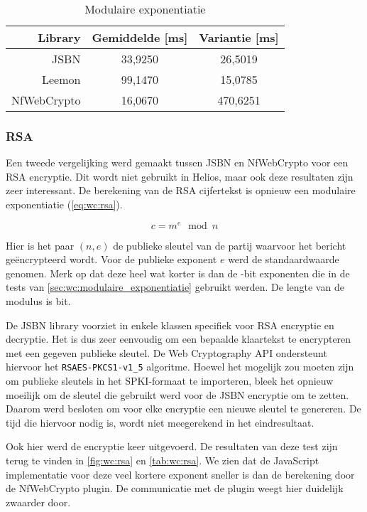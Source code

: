 \begin{table}
  \centering
  \caption{Modulaire exponentiatie}
  \label{tab:wc:modular_exponentiation}
  \begin{tabular}{r | c c}
    Library & Gemiddelde [ms] & Variantie [ms] \\ \hline
    JSBN & 33,9250 & 26,5019  \\
    Leemon & 99,1470 & 15,0785 \\
    NfWebCrypto & 16,0670 & 470,6251
  \end{tabular}
\end{table}

\subsubsection{RSA}

Een tweede vergelijking werd gemaakt tussen JSBN en NfWebCrypto voor een RSA encryptie. Dit wordt niet gebruikt in Helios, maar ook deze resultaten zijn zeer interessant. De berekening van de RSA cijfertekst is opnieuw een modulaire exponentiatie (\ref{eq:wc:rsa}).\cite{rivest_shamir_adleman_rsa}

\begin{equation}
  \label{eq:wc:rsa}
  c = m^e \mod{n}
\end{equation}

\npar Hier is het paar $(n, e)$ de publieke sleutel van de partij waarvoor het bericht ge\"encrypteerd wordt. Voor de publieke exponent $e$ werd de standaardwaarde  genomen. Merk op dat deze heel wat korter is dan de -bit exponenten die in de tests van \ref{sec:wc:modulaire_exponentiatie} gebruikt werden. De lengte van de modulus is  bit.

\npar De JSBN library voorziet in enkele klassen specifiek voor RSA encryptie en decryptie. Het is dus zeer eenvoudig om een bepaalde klaartekst te encrypteren met een gegeven publieke sleutel. De Web Cryptography API ondersteunt hiervoor het \texttt{RSAES-PKCS1-v1\_5} algoritme.\cite{rfc3447} Hoewel het mogelijk zou moeten zijn om publieke sleutels in het SPKI-formaat te importeren, bleek het opnieuw moeilijk om de sleutel die gebruikt werd voor de JSBN encryptie om te zetten. Daarom werd besloten om voor elke encryptie een nieuwe sleutel te genereren. De tijd die hiervoor nodig is, wordt niet meegerekend in het eindresultaat.

\npar Ook hier werd de encryptie  keer uitgevoerd. De resultaten van deze test zijn terug te vinden in \ref{fig:wc:rsa} en \ref{tab:wc:rsa}. We zien dat de JavaScript implementatie voor deze veel kortere exponent sneller is dan de berekening door de NfWebCrypto plugin. De communicatie met de plugin weegt hier duidelijk zwaarder door.

